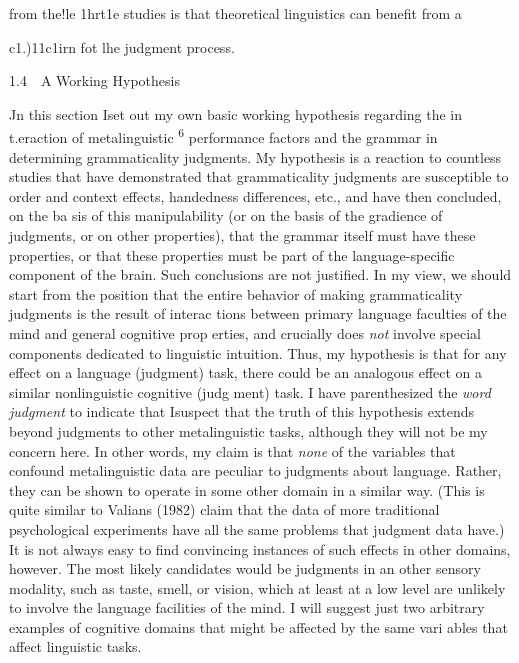 \begin{styleStandard}
from the!le 1hrt1e studies is that theoretical linguistics can benefit from a
\end{styleStandard}


\begin{styleStandard}
c1.)11c1irn fot lhe judgment process.
\end{styleStandard}


\begin{styleStandard}
1.4\ \ A Working Hypothesis
\end{styleStandard}


\begin{styleStandard}
Jn this section Iset out my own basic working hypothesis regarding the in\- t.eraction of metalinguistic \textsuperscript{6}\textsuperscript{ }performance factors and the grammar in determining grammaticality judgments. My hypothesis is a reaction to countless studies that have demonstrated that grammaticality judgments are susceptible to order and context effects, handedness differences, etc., and have then concluded, on the ba\- sis of this manipulability (or on the basis of the gradience of judgments, or on other properties), that the grammar itself must have these properties, or that these properties must be part of the language-specific component of the brain. Such conclusions are not justified. In my view, we should start from the position that the entire behavior of making grammaticality judgments is the result of interac\- tions between primary language faculties of the mind and general cognitive prop\- erties, and crucially does \textit{not}\textit{ }involve special components dedicated to linguistic intuition. Thus, my hypothesis is that for any effect on a language (judgment) task, there could be an analogous effect on a similar nonlinguistic cognitive (judg\- ment) task. I have parenthesized the \textit{word}\textit{ }\textit{judgment}\textit{ }to indicate that Isuspect that the truth of this hypothesis extends beyond judgments to other metalinguistic tasks, although they will not be my concern here. In other words, my claim is that \textit{none}\textit{ }of the variables that confound metalinguistic data are peculiar to judgments about language. Rather, they can be shown to operate in some other domain in a similar way. (This is quite similar to Valian{\textquotesingle}s (1982) claim that the data of more traditional psychological experiments have all the same problems that judgment data have.) It is not always easy to find convincing instances of such effects in other domains, however. The most likely candidates would be judgments in an\- other sensory modality, such as taste, smell, or vision, which at least at a low level are unlikely to involve the language facilities of the mind. I will suggest just two arbitrary examples of cognitive domains that might be affected by the same vari\- ables that affect linguistic tasks.
\end{styleStandard}


